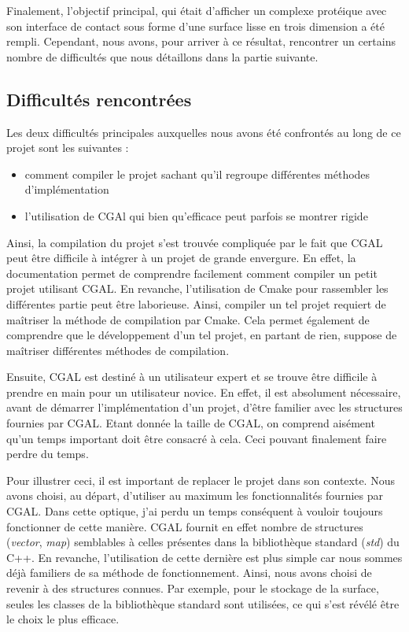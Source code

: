 Finalement, l'objectif principal, qui était d'afficher un complexe protéique avec son
interface de contact sous forme d'une surface lisse en trois dimension a été rempli.
Cependant, nous avons, pour arriver à ce résultat, rencontrer un certains nombre de difficultés que nous
détaillons dans la partie suivante.


\subsection*{Difficultés rencontrées}
Les deux difficultés principales auxquelles nous avons été confrontés au long de ce projet
sont les suivantes :
\begin{itemize}
  \item comment compiler le projet sachant qu'il regroupe différentes méthodes d'implémentation
  \item l'utilisation de CGAl qui bien qu'efficace peut parfois se montrer rigide
\end{itemize}

Ainsi, la compilation du projet s'est trouvée compliquée par le fait que CGAL peut être difficile
à intégrer à un projet de grande envergure. En effet, la documentation permet de
comprendre facilement comment compiler un petit projet utilisant CGAL. En revanche, l'utilisation de Cmake
pour rassembler les différentes partie peut être laborieuse. Ainsi, compiler un tel projet
requiert de maîtriser la méthode de compilation par Cmake. Cela permet également de comprendre
que le développement d'un tel projet, en partant de rien, suppose de maîtriser différentes
méthodes de compilation.

Ensuite, CGAL est destiné à un utilisateur expert et se trouve être difficile à prendre
en main pour un utilisateur novice. En effet, il est absolument nécessaire, avant de
démarrer l'implémentation d'un projet, d'être familier avec les structures fournies par CGAL.
Etant donnée la taille de CGAL, on comprend aisément qu'un temps important doit être
consacré à cela. Ceci pouvant finalement faire perdre du temps.

Pour illustrer ceci, il est important de replacer le projet dans son contexte. Nous avons
choisi, au départ, d'utiliser au maximum les fonctionnalités fournies par CGAL.
Dans cette optique, j'ai perdu un temps conséquent à vouloir toujours fonctionner de cette manière.
CGAL fournit en effet nombre de structures (\textit{vector}, \textit{map}) semblables
à celles présentes dans la bibliothèque standard (\textit{std}) du C++. En revanche, l'utilisation
de cette dernière est plus simple car nous sommes déjà familiers de sa méthode de fonctionnement.
Ainsi, nous avons choisi de revenir à des structures connues. Par exemple, pour le stockage de la
surface, seules les classes de la bibliothèque standard sont utilisées, ce qui s'est
révélé être le choix le plus efficace.

